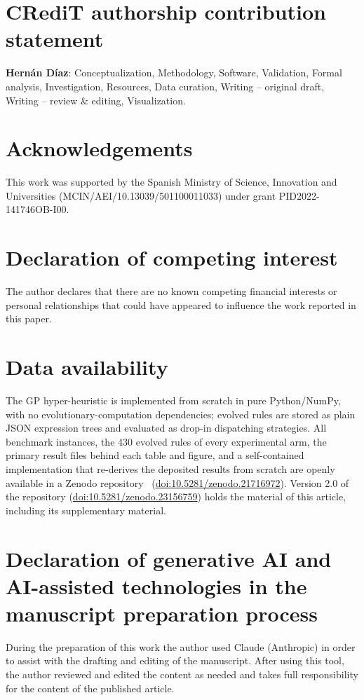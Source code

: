 \documentclass[review,authoryear,11pt]{elsarticle}
\begin{document}
\section*{CRediT authorship contribution statement}
\textbf{Hern\'an D\'iaz}: Conceptualization, Methodology, Software,
Validation, Formal analysis, Investigation, Resources, Data curation,
Writing -- original draft, Writing -- review \& editing, Visualization.

\section*{Acknowledgements}
This work was supported by the Spanish Ministry of Science, Innovation
and Universities (MCIN/AEI/10.13039/501100011033) under grant
PID2022-141746OB-I00.

\section*{Declaration of competing interest}
The author declares that there are no known competing financial
interests or personal relationships that could have appeared to
influence the work reported in this paper.

\section*{Data availability}
The GP hyper-heuristic is implemented from scratch in pure Python/NumPy,
with no evolutionary-computation dependencies; evolved rules are stored
as plain JSON expression trees and evaluated as drop-in dispatching
strategies. All benchmark
instances, the 430 evolved rules of every experimental arm, the primary
result files behind each table and figure, and a self-contained
implementation that re-derives the deposited results from scratch are
openly available in a Zenodo repository~\citep{DiazDataset2026}
(\href{https://doi.org/10.5281/zenodo.21716972}{doi:10.5281/zenodo.21716972}).
Version 2.0 of the repository
(\href{https://doi.org/10.5281/zenodo.23156759}{doi:10.5281/zenodo.23156759})
holds the material of this article, including its supplementary
material.

\section*{Declaration of generative AI and AI-assisted technologies in
the manuscript preparation process}
During the preparation of this work the author used Claude (Anthropic)
in order to assist with the drafting and editing of the manuscript.
After using this tool, the author reviewed and edited the content as
needed and takes full responsibility for the content of the published
article.



\end{document}
